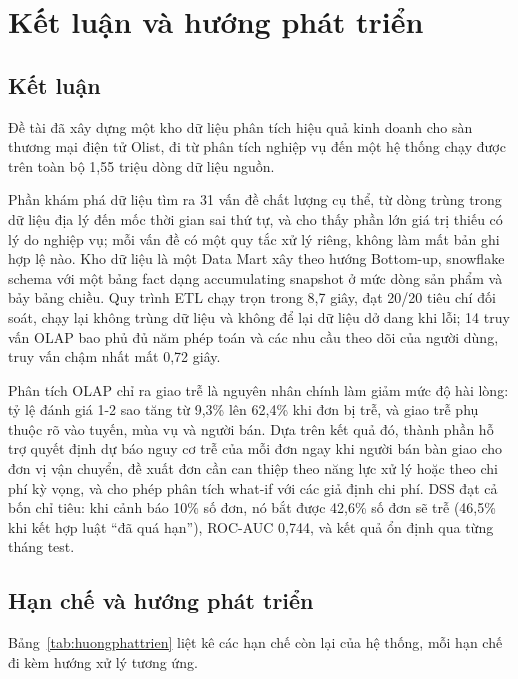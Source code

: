 \section{Kết luận và hướng phát triển}\label{sec:ketluan}

\subsection{Kết luận}

Đề tài đã xây dựng một kho dữ liệu phân tích hiệu quả kinh doanh cho sàn thương mại điện tử Olist, đi từ phân tích nghiệp vụ đến một hệ thống chạy được trên toàn bộ 1,55 triệu dòng dữ liệu nguồn.

Phần khám phá dữ liệu tìm ra 31 vấn đề chất lượng cụ thể, từ dòng trùng trong dữ liệu địa lý đến mốc thời gian sai thứ tự, và cho thấy phần lớn giá trị thiếu có lý do nghiệp vụ; mỗi vấn đề có một quy tắc xử lý riêng, không làm mất bản ghi hợp lệ nào. Kho dữ liệu là một Data Mart xây theo hướng Bottom-up, snowflake schema với một bảng fact dạng accumulating snapshot ở mức dòng sản phẩm và bảy bảng chiều. Quy trình ETL chạy trọn trong 8,7 giây, đạt 20/20 tiêu chí đối soát, chạy lại không trùng dữ liệu và không để lại dữ liệu dở dang khi lỗi; 14 truy vấn OLAP bao phủ đủ năm phép toán và các nhu cầu theo dõi của người dùng, truy vấn chậm nhất mất 0,72 giây.

Phân tích OLAP chỉ ra giao trễ là nguyên nhân chính làm giảm mức độ hài lòng: tỷ lệ đánh giá 1-2 sao tăng từ 9,3\% lên 62,4\% khi đơn bị trễ, và giao trễ phụ thuộc rõ vào tuyến, mùa vụ và người bán. Dựa trên kết quả đó, thành phần hỗ trợ quyết định dự báo nguy cơ trễ của mỗi đơn ngay khi người bán bàn giao cho đơn vị vận chuyển, đề xuất đơn cần can thiệp theo năng lực xử lý hoặc theo chi phí kỳ vọng, và cho phép phân tích what-if với các giả định chi phí. DSS đạt cả bốn chỉ tiêu: khi cảnh báo 10\% số đơn, nó bắt được 42,6\% số đơn sẽ trễ (46,5\% khi kết hợp luật ``đã quá hạn''), ROC-AUC 0,744, và kết quả ổn định qua từng tháng test.

\subsection{Hạn chế và hướng phát triển}\label{sec:huongphattrien}

Bảng~\ref{tab:huongphattrien} liệt kê các hạn chế còn lại của hệ thống, mỗi hạn chế đi kèm hướng xử lý tương ứng.

